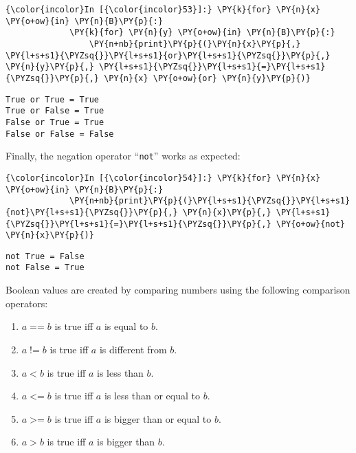 \begin{Verbatim}[commandchars=\\\{\}]
{\color{incolor}In [{\color{incolor}53}]:} \PY{k}{for} \PY{n}{x} \PY{o+ow}{in} \PY{n}{B}\PY{p}{:}
             \PY{k}{for} \PY{n}{y} \PY{o+ow}{in} \PY{n}{B}\PY{p}{:}
                 \PY{n+nb}{print}\PY{p}{(}\PY{n}{x}\PY{p}{,} \PY{l+s+s1}{\PYZsq{}}\PY{l+s+s1}{or}\PY{l+s+s1}{\PYZsq{}}\PY{p}{,} \PY{n}{y}\PY{p}{,} \PY{l+s+s1}{\PYZsq{}}\PY{l+s+s1}{=}\PY{l+s+s1}{\PYZsq{}}\PY{p}{,} \PY{n}{x} \PY{o+ow}{or} \PY{n}{y}\PY{p}{)}
\end{Verbatim}


\begin{Verbatim}[commandchars=\\\{\}]
True or True = True
True or False = True
False or True = True
False or False = False
\end{Verbatim}
Finally, the negation operator ``\texttt{not}'' works as expected:

\begin{Verbatim}[commandchars=\\\{\}]
{\color{incolor}In [{\color{incolor}54}]:} \PY{k}{for} \PY{n}{x} \PY{o+ow}{in} \PY{n}{B}\PY{p}{:}
             \PY{n+nb}{print}\PY{p}{(}\PY{l+s+s1}{\PYZsq{}}\PY{l+s+s1}{not}\PY{l+s+s1}{\PYZsq{}}\PY{p}{,} \PY{n}{x}\PY{p}{,} \PY{l+s+s1}{\PYZsq{}}\PY{l+s+s1}{=}\PY{l+s+s1}{\PYZsq{}}\PY{p}{,} \PY{o+ow}{not} \PY{n}{x}\PY{p}{)}
\end{Verbatim}

\begin{Verbatim}[commandchars=\\\{\}]
not True = False
not False = True
\end{Verbatim}
Boolean values are created by comparing numbers using the following comparison operators:
\begin{enumerate}
\item $a\;\texttt{==}\;b$ is true iff $a$ is equal to $b$.
\item $a\;\texttt{!=}\;b$ is true iff $a$ is different from $b$.
\item $a\;\texttt{<}\;b$ is true iff $a$ is less than $b$.
\item $a\;\texttt{<=}\;b$ is true iff $a$ is less than or equal to $b$.
\item $a\;\texttt{>=}\;b$ is true iff $a$ is bigger than or equal to $b$.
\item $a\;\texttt{>}\;b$ is true iff $a$ is bigger than $b$.
\end{enumerate}

